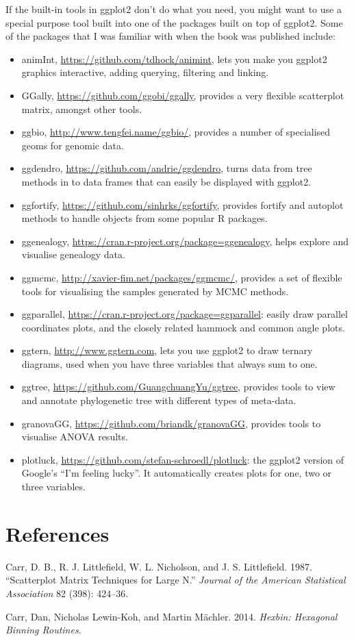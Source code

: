 If the built-in tools in ggplot2 don't do what you need, you might want
to use a special purpose tool built into one of the packages built on
top of ggplot2. Some of the packages that I was familiar with when the
book was published include:

\begin{itemize}
\item
  animInt, \url{https://github.com/tdhock/animint}, lets you make you
  ggplot2 graphics interactive, adding querying, filtering and linking.
\item
  GGally, \url{https://github.com/ggobi/ggally}, provides a very
  flexible scatterplot matrix, amongst other tools.
\item
  ggbio, \url{http://www.tengfei.name/ggbio/}, provides a number of
  specialised geoms for genomic data.
\item
  ggdendro, \url{https://github.com/andrie/ggdendro}, turns data from
  tree methods in to data frames that can easily be displayed with
  ggplot2.
\item
  ggfortify, \url{https://github.com/sinhrks/ggfortify}, provides
  fortify and autoplot methods to handle objects from some popular R
  packages.
\item
  ggenealogy, \url{https://cran.r-project.org/package=ggenealogy}, helps
  explore and visualise genealogy data.
\item
  ggmcmc, \url{http://xavier-fim.net/packages/ggmcmc/}, provides a set
  of flexible tools for visualising the samples generated by MCMC
  methods.
\item
  ggparallel, \url{https://cran.r-project.org/package=ggparallel}:
  easily draw parallel coordinates plots, and the closely related
  hammock and common angle plots.
\item
  ggtern, \url{http://www.ggtern.com}, lets you use ggplot2 to draw
  ternary diagrams, used when you have three variables that always sum
  to one.
\item
  ggtree, \url{https://github.com/GuangchuangYu/ggtree}, provides tools
  to view and annotate phylogenetic tree with different types of
  meta-data.
\item
  granovaGG, \url{https://github.com/briandk/granovaGG}, provides tools
  to visualise ANOVA results.
\item
  plotluck, \url{https://github.com/stefan-schroedl/plotluck}: the
  ggplot2 version of Google's ``I'm feeling lucky''. It automatically
  creates plots for one, two or three variables.
\end{itemize}

\section*{References}\label{references}

\hypertarget{refs}{}
\hypertarget{ref-carr:1987}{}
Carr, D. B., R. J. Littlefield, W. L. Nicholson, and J. S. Littlefield.
1987. ``Scatterplot Matrix Techniques for Large N.'' \emph{Journal of
the American Statistical Association} 82 (398): 424--36.

\hypertarget{ref-hexbin}{}
Carr, Dan, Nicholas Lewin-Koh, and Martin Mächler. 2014. \emph{Hexbin:
Hexagonal Binning Routines}.
